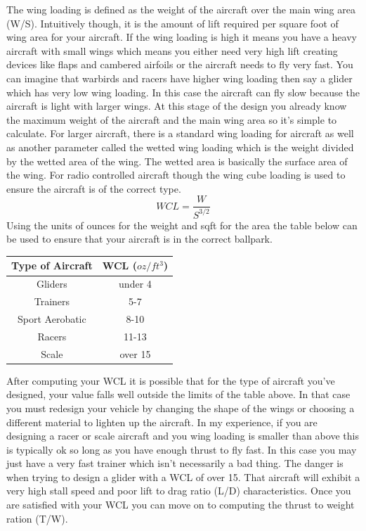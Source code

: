 \documentclass{article}
\begin{document}
The wing loading is defined as the weight of the aircraft over the
main wing area (W/S). Intuitively though, it is the amount of lift
required per square foot of wing area for your aircraft. If the wing
loading is high it means you have a heavy aircraft with small wings
which means you either need very high lift creating devices like flaps
and cambered airfoils or the aircraft needs to fly very fast. You can
imagine that warbirds and racers have higher wing loading then say a
glider which has very low wing loading. In this case the aircraft can
fly slow because the aircraft is light with larger wings. At this
stage of the design you already know the maximum weight of the
aircraft and the main wing area so it's simple to calculate. For
larger aircraft, there is a standard wing loading for aircraft as well
as another parameter called the wetted wing loading which is the
weight divided by the wetted area of the wing. The wetted area is
basically the surface area of the wing. For radio controlled aircraft
though the wing cube loading is used to ensure the aircraft is of the
correct type.
\begin{equation}
WCL = \frac{W}{S^{3/2}}
\end{equation}
Using the units of ounces for the weight and sqft for the area the
table below can be used to ensure that your aircraft is in the correct
ballpark\cite{WCL}.
\begin{table}[H]
  \begin{center}
  \begin{tabular}{cc}
    Type of Aircraft & WCL ($oz/ft^3$) \\
    \hline
    \hline
    Gliders & under 4\\
    \hline
    Trainers & 5-7\\
    \hline
    Sport Aerobatic & 8-10\\
    \hline
    Racers & 11-13 \\
    \hline
    Scale & over 15 \\
  \end{tabular}
  \end{center}
\end{table}
After computing your WCL it is possible that for the type of aircraft
you've designed, your value falls well outside the limits of the table
above. In that case you must redesign your vehicle by changing the shape
of the wings or choosing a different material to lighten up the
aircraft. In my experience, if you are designing a racer or scale
aircraft and you wing loading is smaller than above this is typically
ok so long as you have enough thrust to fly fast. In this case you may
just have a very fast trainer which isn't necessarily a bad thing. The
danger is when trying to design a glider with a WCL of over 15. That
aircraft will exhibit a very high stall speed and poor lift to drag
ratio (L/D) characteristics. Once you are satisfied with your WCL you
can move on to computing the thrust to weight ration (T/W).
\end{document}
